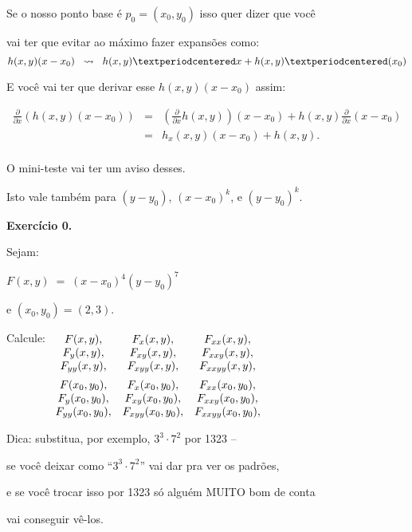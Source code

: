 \documentclass[oneside,12pt]{article}
\begin{document}

\ssk

Se o nosso ponto base é $p_0 = (x_0,y_0)$ isso quer dizer que você

vai ter que evitar ao máximo fazer expansões como:
%
$$h(x,y) (x-x_0) \;\; \squigto \;\; h(x,y)·x + h(x,y)·(x_0)$$

E você vai ter que derivar esse $h(x,y) (x-x_0)$ assim:

$$\begin{array}{rcl}
  \frac{∂}{∂x} (h(x,y) (x-x_0)) &=& (\frac{∂}{∂x}h(x,y)) (x-x_0) + h(x,y) \frac{∂}{∂x}(x-x_0) \\
                                &=& h_x(x,y) (x-x_0) + h(x,y). \\
  \end{array}
$$

O mini-teste vai ter um aviso desses.

Isto vale também para $(y-y_0)$, $(x-x_0)^k$, e $(y-y_0)^k$.

\newpage


{\bf Exercício 0.}

Sejam:

$F(x,y) \; =\;  (x-x_0)^4 (y-y_0)^7$

e $(x_0,y_0) = (2,3)$.

\msk

Calcule:
%
$\begin{array}[t]{cccccccc}
 F(x,y),      & F_x(x,y),     & F_{xx}(x,y), \\
 F_y(x,y),    & F_{xy}(x,y),  & F_{xxy}(x,y), \\
 F_{yy}(x,y), & F_{xyy}(x,y), & F_{xxyy}(x,y), \\[5pt]
 F(x_0,y_0),      & F_x(x_0,y_0),     & F_{xx}(x_0,y_0), \\
 F_y(x_0,y_0),    & F_{xy}(x_0,y_0),  & F_{xxy}(x_0,y_0), \\
 F_{yy}(x_0,y_0), & F_{xyy}(x_0,y_0), & F_{xxyy}(x_0,y_0), \\
 \end{array}
$

\msk

Dica:  substitua, por exemplo, $3^3 · 7^2$ por 1323 --

se você deixar como ``$3^3 · 7^2$'' vai dar pra ver os padrões,

e se você trocar isso por 1323 só alguém MUITO bom de conta

vai conseguir vê-los.
\end{document}
